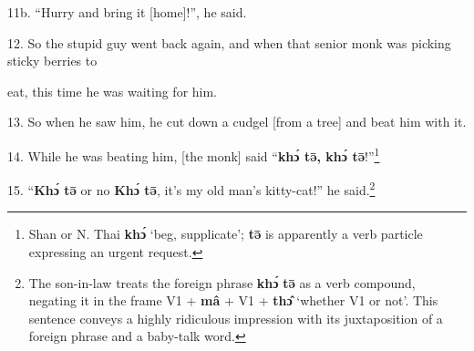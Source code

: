 11b. ``Hurry and bring it [home]!'', he said.

12. So the stupid guy went back again, and when that senior monk was picking sticky
berries to

eat, this time he was waiting for him.

13. So when he saw him, he cut down a cudgel [from a tree] and beat him with it.

14. While he was beating him, [the monk] said ``\textbf{khɔ́ tə̄, khɔ́ tə̄}!''\footnote{Shan or N. Thai \textbf{khɔ́} `beg, supplicate'; \textbf{tə̄} is apparently a verb particle expressing an urgent request.}

15. ``\textbf{Khɔ́ tə̄} or no \textbf{Khɔ́ tə̄},\textbf{ }it's my old man's
kitty-cat!'' he said.\footnote{The son-in-law treats the foreign phrase \textbf{khɔ́} \textbf{tə̄} as a verb compound, negating it in the frame V1 + \textbf{mâ} + V1 + \textbf{thɔ̂} `whether V1 or not'. This sentence conveys a highly ridiculous impression with its juxtaposition of a foreign phrase and a baby-talk word.}

